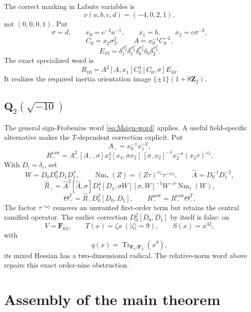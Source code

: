 \documentclass[11pt,reqno]{amsart}
\theoremstyle{definition}
\theoremstyle{remark}
\numberwithin{equation}{section}
\newcommand{\Q}{\mathbf Q}
\newcommand{\Z}{\mathbf Z}
\newcommand{\F}{\mathbf F}
\newcommand{\Nm}{\operatorname{Nm}}
\newcommand{\Tr}{\operatorname{Tr}}
\begin{document}
The correct marking in Labute variables is
\[
 \nu(a,b,c,d)=(-4,0,2,1),
\]
not \((0,0,0,1)\).  Put
\[
 \sigma=d,\qquad x_0=c^{-2}a^{-1},\qquad
 x_1=b,\qquad x_2=c\sigma^{-2},
\]
\[
 C_0=x_2\sigma_2^2,\qquad A=x_0^{-1}C_0^{-2},
\]
\[
 E_{10}
 =\delta_1^{\sigma_2^8}
  \delta_1^{\sigma_2^4}
  \delta_0^{\sigma_2^4}
  \delta_0
  \delta_2^{\sigma_2^2}.
\]
The exact specialized word is
\[
 R_{10}=A^2[A,x_1]C_0^4[C_0,\sigma]E_{10}.
\]
It realizes the required inertia orientation image
\(\{\pm1\}(1+8\Z_2)\).

\subsection{\texorpdfstring{\(\Q_2(\sqrt{-10})\)}{Q2(sqrt(-10))}}

The general sign-Frobenius word \eqref{eq:Msign-word} applies.  A useful
field-specific alternative makes the \(T\)-dependent correction
explicit.  Put
\[
 A_-=x_0^{-1}x_1^{-2},
\]
\[
 R_-^{\mathrm{raw}}
 =A_-^2[A_-,\sigma]x_1^4[x_1,\sigma x_2]\,
 [\sigma,x_2]^{-1}x_2^{-\sigma}(x_2\tau)^{\omega_2}.
\]
With \(D_i=\delta_i\), set
\[
 W=D_0D_0^\sigma D_1D_1^\sigma,\qquad
 \Nm_\tau(Z)=(Z\tau)^{\omega_2}\tau^{-\omega_2},\qquad
 \widehat A=D_0^{-1}D_1^{-2},
\]
\[
\widehat R_-=
\widehat A^2[\widehat A,\sigma]D_1^4
[D_1,\sigma W][\sigma,W]^{-1}
W^{-\sigma}\Nm_\tau(W),
\]
\[
 \Theta_-^T=\widehat R_-D_0^2[D_0,D_1],\qquad
 R_-^{\mathrm{new}}=R_-^{\mathrm{raw}}\Theta_-^T.
\]
The factor \(\tau^{-\omega_2}\) removes an unwanted first-order term but
retains the central ramified operator.  The earlier correction
\(D_0^2[D_0,D_1]\) by itself is false: on
\[
 V=\F_{64},\qquad T(x)=\zeta x\ (|\zeta|=9),\qquad S(x)=x^{32},
\]
with
\[
 q(x)=\Tr_{\F_8/\F_2}(x^9),
\]
its mixed Hessian has a two-dimensional radical.  The relative-norm
word above repairs this exact order-nine obstruction.

\section{Assembly of the main theorem}\label{sec:assembly}
\end{document}
